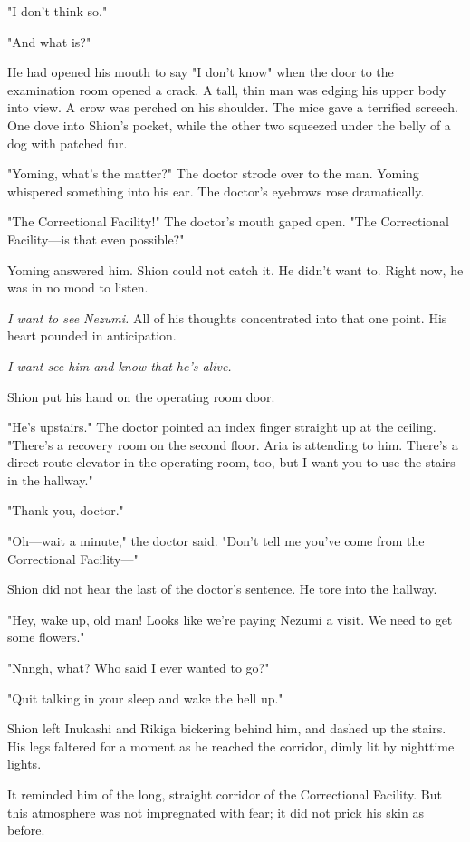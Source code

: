 "I don't think so."

"And what is?"

He had opened his mouth to say "I don't know" when the door to the
examination room opened a crack. A tall, thin man was edging his upper
body into view. A crow was perched on his shoulder. The mice gave a
terrified screech. One dove into Shion's pocket, while the other two
squeezed under the belly of a dog with patched fur.

"Yoming, what's the matter?" The doctor strode over to the man. Yoming
whispered something into his ear. The doctor's eyebrows rose
dramatically.

"The Correctional Facility!" The doctor's mouth gaped open. "The
Correctional Facility---is that even possible?"

Yoming answered him. Shion could not catch it. He didn't want to. Right
now, he was in no mood to listen.

\emph{I want to see Nezumi.} All of his thoughts concentrated into that one
point. His heart pounded in anticipation.

\emph{I want see him and know that he's alive.}

Shion put his hand on the operating room door.

"He's upstairs." The doctor pointed an index finger straight up at the
ceiling. "There's a recovery room on the second floor. Aria is attending
to him. There's a direct-route elevator in the operating room, too, but
I want you to use the stairs in the hallway."

"Thank you, doctor."

"Oh---wait a minute," the doctor said. "Don't tell me you've come from the
Correctional Facility---"

Shion did not hear the last of the doctor's sentence. He tore into the
hallway.

"Hey, wake up, old man! Looks like we're paying Nezumi a visit. We need
to get some flowers."

"Nnngh, what? Who said I ever wanted to go?"

"Quit talking in your sleep and wake the hell up."

Shion left Inukashi and Rikiga bickering behind him, and dashed up the
stairs. His legs faltered for a moment as he reached the corridor, dimly
lit by nighttime lights.

It reminded him of the long, straight corridor of the Correctional
Facility. But this atmosphere was not impregnated with fear; it did not
prick his skin as before.

